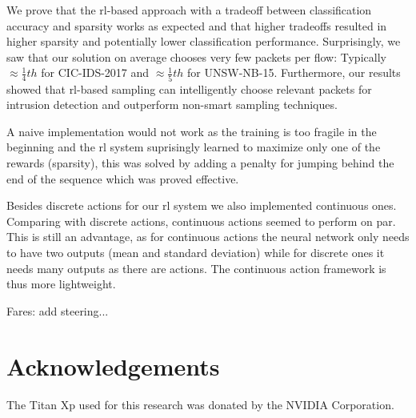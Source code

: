 \documentclass[conference]{IEEEtran}
\newcommand\note[2]{{\color{#1}#2}}
\begin{document}
We prove that the \gls{rl}-based approach with a tradeoff between classification accuracy and sparsity works as expected and that higher tradeoffs resulted in higher sparsity and potentially lower classification performance. Surprisingly, we saw that our solution \ours{} on average chooses very few packets per flow: Typically $\approx \frac{1}{4}th$ for CIC-IDS-2017 and $\approx \frac{1}{5}th$ for UNSW-NB-15. Furthermore, our results showed that \gls{rl}-based sampling can intelligently choose relevant packets for intrusion detection and outperform non-smart sampling techniques.

A naive implementation would not work as the training is too fragile in the beginning and the \gls{rl} system suprisingly learned to maximize only one of the rewards (sparsity), this was solved by adding a penalty for jumping behind the end of the sequence which was proved effective.

Besides discrete actions for our \gls{rl} system we also implemented continuous ones. Comparing with discrete actions, continuous actions seemed to perform on par. This is still an advantage, as for continuous actions the neural network only needs to have two outputs (mean and standard deviation) while for discrete ones it needs many outputs as there are actions. The continuous action framework is thus more lightweight.

\note{blue}{Fares: add steering...}




\section*{Acknowledgements}
The Titan Xp used for this research was donated by the NVIDIA Corporation.

\renewcommand*{\bibfont}{\small}


\end{document}
